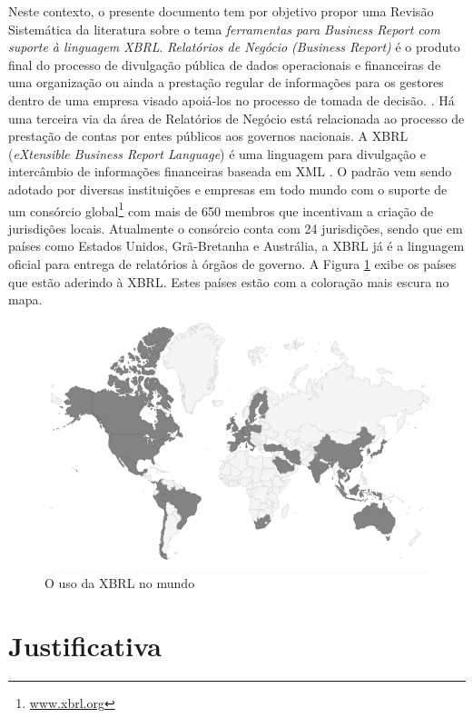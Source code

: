 \documentclass[12pt]{article}
\begin{document}
Neste contexto, o presente documento tem por objetivo propor uma Revisão
Sistemática da literatura sobre o tema \textit{ferramentas para Business Report com suporte à linguagem XBRL}. \textit{Relatórios  de Negócio (Business Report)} é o produto final do  processo de divulgação pública de dados operacionais e financeiras de uma organização ou ainda a prestação regular de informações para os gestores dentro de uma empresa visado apoiá-los no processo de tomada de decisão.
\cite{lymer1999business}. Há uma terceira via da área de  Relatórios de Negócio
está relacionada ao processo de prestação de contas por entes públicos aos
governos nacionais. A XBRL (\textit{eXtensible Business Report Language})
é uma linguagem para divulgação e intercâmbio de informações financeiras
baseada em XML \cite{xbrl_conceitos_aplicacoes}. O padrão vem sendo adotado por diversas instituições e empresas em todo mundo com o suporte de um consórcio global\footnote{\url{www.xbrl.org}} com mais de 650 membros que incentivam a criação de jurisdições locais. Atualmente o consórcio conta com 24 jurisdições, sendo que em países como  Estados Unidos, Grã-Bretanha e Austrália, a XBRL já é a linguagem oficial para entrega
de relatórios à órgãos de governo. A Figura \ref{fig:world_map} exibe os países
que estão aderindo à XBRL. Estes países estão com a coloração mais escura no mapa.

\begin{figure}[htb]
\centering
\includegraphics[width=.75\textwidth]{../img/world-map.png}
\caption{O uso da XBRL no mundo}
\label{fig:world_map}
\end{figure}

\section{Justificativa}
\label{sec:problema}
\end{document}
